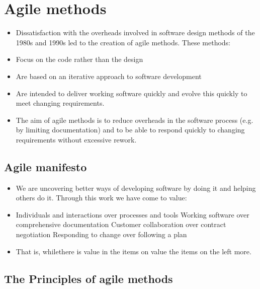 \section{ Agile methods}
\begin{itemize}

\item Dissatisfaction with the overheads involved in software design methods of the 1980s and 1990s led to the creation of agile methods. These methods:

\item Focus on the code rather than the design

\item Are based on an iterative approach to software development

\item Are intended to deliver working software quickly and evolve this quickly to meet changing requirements.

\item The aim of agile methods is to reduce overheads in the software process (e.g. by limiting documentation) and to be able to respond quickly to changing requirements without excessive rework.


\end{itemize}
\subsection{ Agile manifesto}
\begin{itemize}

\item We are uncovering better ways of developing software by doing it and helping others do it. Through this work we have come to value:

\item Individuals and interactions over processes and tools Working software over comprehensive documentation Customer collaboration over contract negotiation Responding to change over following a plan
\item That is, whilethere is value in the items on value the items on the left more.

\end{itemize}
\subsection{The Principles of agile methods}

